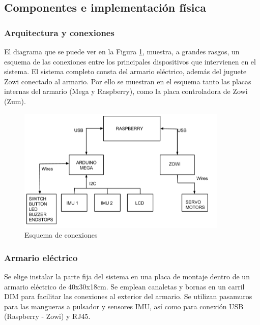\subsection{Componentes e implementación física}

\subsubsection{Arquitectura y conexiones}

El diagrama que se puede ver en la Figura \ref{fig:diagFinal}, muestra, a grandes rasgos, un esquema de las conexiones entre los principales dispositivos que intervienen en el sistema. El sistema completo consta del armario eléctrico, además del juguete Zowi conectado al armario. Por ello se muestran en el esquema tanto las placas internas del armario (Mega y Raspberry), como la placa controladora de Zowi (Zum).

\begin{figure}
\centering
\includegraphics[width=100mm]{Figures/diagFinal}
\caption{Esquema de conexiones}
\label{fig:diagFinal}
\end{figure}

\subsubsection{Armario eléctrico}

Se elige instalar la parte fija del sistema en una placa de montaje dentro de un armario eléctrico de 40x30x18cm. Se emplean canaletas y bornas en un carril DIM para facilitar las conexiones al exterior del armario. Se utilizan pasamuros para las mangueras a pulsador y sensores IMU, así como para conexión USB (Raspberry - Zowi) y RJ45.

